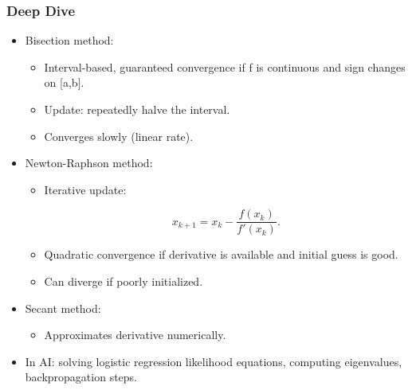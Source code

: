 \documentclass[
  letterpaper,
  DIV=11,
  numbers=noendperiod]{scrreprt}
\providecommand{\tightlist}{%
  \setlength{\itemsep}{0pt}\setlength{\parskip}{0pt}}
\begin{document}
\subsubsection{Deep Dive}\label{deep-dive-151}

\begin{itemize}
\item
  Bisection method:

  \begin{itemize}
  \tightlist
  \item
    Interval-based, guaranteed convergence if f is continuous and sign
    changes on {[}a,b{]}.
  \item
    Update: repeatedly halve the interval.
  \item
    Converges slowly (linear rate).
  \end{itemize}
\item
  Newton-Raphson method:

  \begin{itemize}
  \item
    Iterative update:

    \[
    x_{k+1} = x_k - \frac{f(x_k)}{f'(x_k)}.
    \]
  \item
    Quadratic convergence if derivative is available and initial guess
    is good.
  \item
    Can diverge if poorly initialized.
  \end{itemize}
\item
  Secant method:

  \begin{itemize}
  \tightlist
  \item
    Approximates derivative numerically.
  \end{itemize}
\item
  In AI: solving logistic regression likelihood equations, computing
  eigenvalues, backpropagation steps.
\end{itemize}
\end{document}
